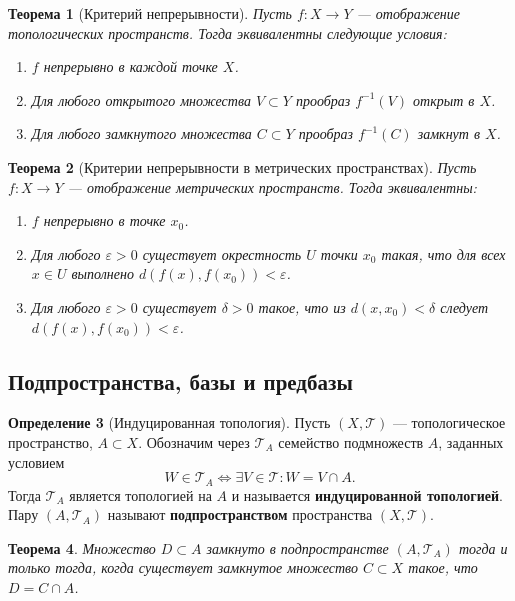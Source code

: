 \documentclass[12pt,a4paper]{article}
\newtheorem{theorem}{Теорема}[section]
\theoremstyle{definition}
\newtheorem{definition}[theorem]{Определение}
\begin{document}
\begin{theorem}[Критерий непрерывности]
Пусть $f: X \to Y$ --- отображение топологических пространств. Тогда эквивалентны следующие условия:
\begin{enumerate}
    \item $f$ непрерывно в каждой точке $X$.
    \item Для любого открытого множества $V \subset Y$ прообраз $f^{-1}(V)$ открыт в $X$.
    \item Для любого замкнутого множества $C \subset Y$ прообраз $f^{-1}(C)$ замкнут в $X$.
\end{enumerate}
\end{theorem}

\begin{theorem}[Критерии непрерывности в метрических пространствах]
Пусть $f: X \to Y$ --- отображение метрических пространств. Тогда эквивалентны:
\begin{enumerate}
    \item $f$ непрерывно в точке $x_0$.
    \item Для любого $\varepsilon > 0$ существует окрестность $U$ точки $x_0$ такая, что для всех $x \in U$ выполнено $d(f(x), f(x_0)) < \varepsilon$.
    \item Для любого $\varepsilon > 0$ существует $\delta > 0$ такое, что из $d(x, x_0) < \delta$ следует $d(f(x), f(x_0)) < \varepsilon$.
\end{enumerate}
\end{theorem}

\subsection{Подпространства, базы и предбазы}

\begin{definition}[Индуцированная топология]
Пусть $(X, \mathcal{T})$ --- топологическое пространство, $A \subset X$. Обозначим через $\mathcal{T}_A$ семейство подмножеств $A$, заданных условием
$$W \in \mathcal{T}_A \iff \exists V \in \mathcal{T} : W = V \cap A.$$
Тогда $\mathcal{T}_A$ является топологией на $A$ и называется \textbf{индуцированной топологией}. Пару $(A, \mathcal{T}_A)$ называют \textbf{подпространством} пространства $(X, \mathcal{T})$.
\end{definition}

\begin{theorem}
Множество $D \subset A$ замкнуто в подпространстве $(A, \mathcal{T}_A)$ тогда и только тогда, когда существует замкнутое множество $C \subset X$ такое, что $D = C \cap A$.
\end{theorem}
\end{document}
